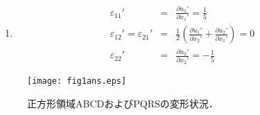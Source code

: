 {\begin{enumerate}
\begin{eqnarray}
\begin{array}{cccc}
		 0 & 1 & 1 & 0  \\
		 0 & 0 & 1 & 1
		\end{array}
	\right) \\
	&=&
	\frac{1}{5}
	\left( 
		\begin{array}{cccc}
		 0 &  1  & 1  & 0  \\
		 0 &  0  & -1  & -1 
		\end{array}
	\right)
\end{eqnarray}
である．よって, $o-x_1'x_2'$座標系における変形後の頂点の座標は，
\begin{equation}
	P' = \left( 0,0 \right) ,\  Q' = \left(  \frac{6}{5},0 \right) ,\  
	R' = \left(\frac{6}{5}, \frac{4}{5}\right) ,\  S' = \left(0,\frac{4}{5}\right)
\end{equation}
となる．以上より，正方形領域PQRSは, 変形後, 図\ref{fig:fig1}(b)
に示すような長方形P'Q'R'S'に移されることがわかる．
\item
\begin{eqnarray}
	\varepsilon_{11}' &=& \frac{\partial u_1'}{\partial x_1'}=\frac{1}{5} \\
	\varepsilon_{12}' =\varepsilon_{21}' 
	&=& \frac{1}{2}\left(
		\frac{\partial u_1'}{\partial x_2'}
		+
		\frac{\partial u_2'}{\partial x_1'}
		\right) 
		=0
		\\
	\varepsilon_{22}' &=& \frac{\partial u_2'}{\partial x_2'}=-\frac{1}{5}
\end{eqnarray}
\end{enumerate}
}
\begin{figure}[h]
	\begin{center}
	\texttt{[image: fig1ans.eps]} 
	\end{center}
	\vspace{-5mm}
	\caption{正方形領域ABCDおよびPQRSの変形状況．} 
	\label{fig:fig1}
\end{figure}

